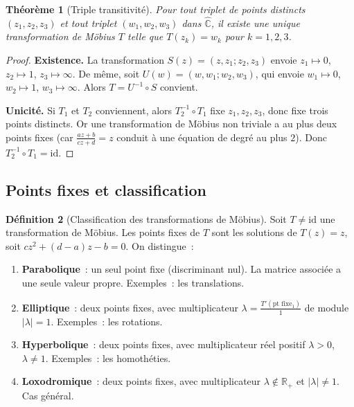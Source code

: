 \documentclass[12pt,a4paper,openany]{book}
\theoremstyle{definition}
\newtheorem{definition}{Définition}[chapter]
\theoremstyle{plain}
\newtheorem{theoreme}[definition]{Théorème}
\theoremstyle{remark}
\newcommand{\C}{\mathbb{C}}
\newcommand{\R}{\mathbb{R}}
\newcommand{\abs}[1]{\left|#1\right|}
\begin{document}
\begin{theoreme}[Triple transitivité]\label{thm:triple-transitivite}
Pour tout triplet de points distincts $(z_1, z_2, z_3)$ et tout triplet
$(w_1, w_2, w_3)$ dans $\widehat{\C}$, il existe une unique transformation de
Möbius $T$ telle que $T(z_k) = w_k$ pour $k = 1, 2, 3$.
\end{theoreme}

\begin{proof}
\textbf{Existence.} La transformation $S(z) = (z, z_1; z_2, z_3)$ envoie
$z_1 \mapsto 0$, $z_2 \mapsto 1$, $z_3 \mapsto \infty$. De même, soit
$U(w) = (w, w_1; w_2, w_3)$, qui envoie $w_1 \mapsto 0$, $w_2 \mapsto 1$, $w_3 \mapsto \infty$.
Alors $T = U^{-1} \circ S$ convient.

\textbf{Unicité.} Si $T_1$ et $T_2$ conviennent, alors $T_2^{-1} \circ T_1$
fixe $z_1, z_2, z_3$, donc fixe trois points distincts. Or une transformation
de Möbius non triviale a au plus deux points fixes (car $\frac{az+b}{cz+d} = z$
conduit à une équation de degré au plus $2$). Donc $T_2^{-1} \circ T_1 = \mathrm{id}$.
\end{proof}

\subsection{Points fixes et classification}

\begin{definition}[Classification des transformations de Möbius]\label{def:mobius-classif}
Soit $T \neq \mathrm{id}$ une transformation de Möbius. Les points fixes de $T$ sont
les solutions de $T(z) = z$, soit $cz^2 + (d-a)z - b = 0$. On distingue~:
\begin{enumerate}[label=\textbf{\arabic*.}]
  \item \textbf{Parabolique}~: un seul point fixe (discriminant nul). La matrice
    associée a une seule valeur propre. Exemples~: les translations.
  \item \textbf{Elliptique}~: deux points fixes, avec multiplicateur
    $\lambda = \frac{T'(\text{pt fixe}_1)}{1}$ de module $\abs{\lambda} = 1$.
    Exemples~: les rotations.
  \item \textbf{Hyperbolique}~: deux points fixes, avec multiplicateur réel
    positif $\lambda > 0$, $\lambda \neq 1$. Exemples~: les homothéties.
  \item \textbf{Loxodromique}~: deux points fixes, avec multiplicateur
    $\lambda \notin \R_+$ et $\abs{\lambda} \neq 1$. Cas général.
\end{enumerate}
\end{definition}
\end{document}
